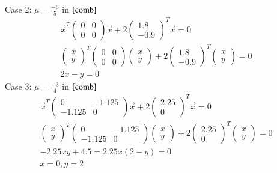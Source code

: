 \documentclass[a5paper,10pt]{article}
\begin{document}
Case 2: $\mu=\frac{-6}{5}$ in $\eqref{comb}$
\begin{align}
    \vec{x}^T\begin{pmatrix}0&0\\0&0\end{pmatrix}\vec{x}+2\begin{pmatrix}1.8\\-0.9\end{pmatrix}^T\vec{x}=0\\
    \begin{pmatrix}x\\y\end{pmatrix}^T\begin{pmatrix}0&0\\0&0\end{pmatrix}\begin{pmatrix}x\\y\end{pmatrix}+2\begin{pmatrix}1.8\\-0.9\end{pmatrix}^T\begin{pmatrix}x\\y\end{pmatrix}=0\\
    2x-y=0
\end{align}
Case 3: $\mu=\frac{-3}{4}$ in $\eqref{comb}$
\begin{align}
    \vec{x}^T\begin{pmatrix}0&-1.125\\-1.125&0\end{pmatrix}\vec{x}+2\begin{pmatrix}2.25\\0\end{pmatrix}^T\vec{x}=0\\
    \begin{pmatrix}x\\y\end{pmatrix}^T\begin{pmatrix}0&-1.125\\-1.125&0\end{pmatrix}\begin{pmatrix}x\\y\end{pmatrix}+2\begin{pmatrix}2.25\\0\end{pmatrix}^T\begin{pmatrix}x\\y\end{pmatrix}=0\\
    -2.25xy+4.5=2.25x(2-y)=0\\
    x=0,y=2
\end{align}
\end{document}
